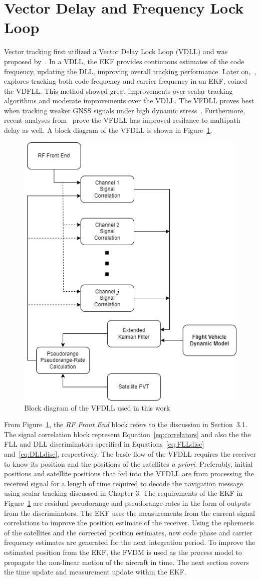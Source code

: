 \section{Vector Delay and Frequency Lock Loop}
Vector tracking first utilized a Vector Delay Lock Loop (VDLL) and was proposed by~\cite{}. In a VDLL, the EKF provides continuous estimates of the code frequency, updating the DLL, improving overall tracking performance. Later on,~\cite{}, explores tracking both code frequency and carrier frequency in an EKF, coined the VDFLL. This method showed great improvements over scalar tracking algorithms and moderate improvements over the VDLL. The VFDLL proves best when tracking weaker GNSS signals under high dynamic stress~\cite{}. Furthermore, recent analyses from~\cite{} prove the VFDLL has improved resilance to multipath delay as well. A block diagram of the VFDLL is shown in Figure~\ref{fig:VFDLL}.

\begin{figure}[!ht]
    \centering
    \includegraphics[width=0.45\linewidth]{Figures/VectorTracking.drawio.png}
    \caption{Block diagram of the VFDLL used in this work}\label{fig:VFDLL}
\end{figure}

From Figure~\ref{fig:VFDLL}, the \textit{RF Front End} block refers to the discussion in Section~3.1. The signal correlation block represent Equation~\ref{eq:correlators} and also the the FLL and DLL discriminators specified in Equations~\ref{eq:FLLdisc} and~\ref{eq:DLLdisc}, respectively. The basic flow of the VFDLL requires the receiver to know its position and the positions of the satellites \textit{a priori}. Preferably, initial positions and satellite positions that fed into the VFDLL are from processing the received signal for a length of time required to decode the navigation message using scalar tracking discussed in Chapter 3. The requirements of the EKF in Figure~\ref{fig:VFDLL} are residual pseudorange and pseudorange-rates in the form of outputs from the discriminators. The EKF uses the measurements from the current signal correlations to improve the position estimate of the receiver. Using the ephemeris of the satellites and the corrected position estimates, new code phase and carrier frequency estimates are generated for the next integration period. To improve the estimated position from the EKF, the FVDM is used as the process model to propagate the non-linear motion of the aircraft in time. The next section covers the time update and measurement update within the EKF.
\clearpage
